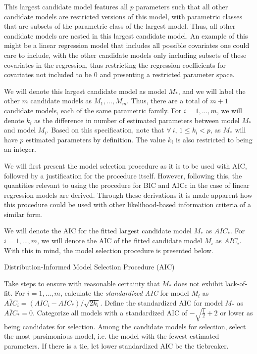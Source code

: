 		This largest candidate model features all $p$ parameters such that all other candidate models are restricted versions of this model, with parametric classes that are subsets of
		the parametric class of the largest model. Thus, all other candidate models are nested in this largest candidate model. An example of this might be a linear regression model that includes all possible covariates
		one could care to include, with the other candidate models only including subsets of these covariates in the regression, thus restricting the regression coefficients for
		covariates not included to be 0 and presenting a restricted parameter space.

		We will denote this largest candidate model as model $M_*$, and we will label the other $m$ candidate models as $M_1,...,M_m$. Thus, there are a total of $m+1$ candidate
		models, each of the same parametric family. For $i=1,...,m$, we will denote $k_i$ as the difference in number of estimated parameters between model $M_*$ and model
		$M_i$. Based on this specification, note that $\forall\: i$, $1 \le k_i < p$, as $M_*$ will have $p$ estimated parameters by definition. The value $k_i$ is also restricted to
		being an integer.

		We will first present the model selection procedure as it is to be used with AIC, followed by a justification for the procedure itself. However, following this, the quantities relevant to using the procedure for BIC and AICc in the case of linear regression models are derived. Through these derivations
		it is made apparent how this procedure could be used with other likelihood-based information criteria of a similar form.

		We will denote the AIC for the fitted largest candidate model $M_*$ as $AIC_*$. For $i=1,...,m$, we will denote the AIC of the fitted candidate model $M_i$ as 
		$AIC_i$. With this in mind, the model selection procedure is presented below.

		\begin{algorithm}[H]
			\caption{Distribution-Informed Model Selection Procedure (AIC)}
			\begin{algorithmic}[1]
			  \State Take steps to ensure with reasonable certainty that $M_*$ does not exhibit lack-of-fit.
			  \State For $i = 1,...,m$, calculate the \textit{standardized AIC} for model $M_i$ as 
			  $\overline{AIC}_i = (AIC_i - AIC_*) / \sqrt{2k_i} $. Define the standardized AIC for model
			  $M_*$ as $\overline{AIC}_* = 0$.
			  \State Categorize all models with a standardized AIC of $ -\sqrt{\frac{1}{2}} + 2$ or lower as
			  being candidates for selection.
			  \State Among the candidate models for selection, select the most parsimonious model, i.e. the model
			  with the fewest estimated parameters. If there is a tie, let lower standardized AIC be the
			  tiebreaker.
			\end{algorithmic}
		\end{algorithm}

